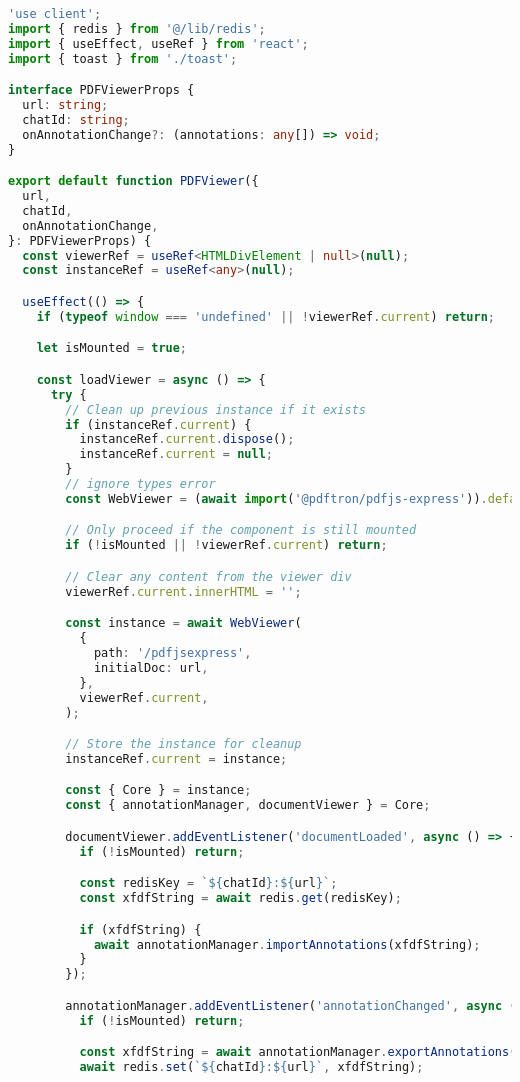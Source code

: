 \begin{lstlisting}[language=TypeScript, caption={Fitur anotasi PDF}]
'use client';
import { redis } from '@/lib/redis';
import { useEffect, useRef } from 'react';
import { toast } from './toast';

interface PDFViewerProps {
  url: string;
  chatId: string;
  onAnnotationChange?: (annotations: any[]) => void;
}

export default function PDFViewer({
  url,
  chatId,
  onAnnotationChange,
}: PDFViewerProps) {
  const viewerRef = useRef<HTMLDivElement | null>(null);
  const instanceRef = useRef<any>(null);

  useEffect(() => {
    if (typeof window === 'undefined' || !viewerRef.current) return;

    let isMounted = true;

    const loadViewer = async () => {
      try {
        // Clean up previous instance if it exists
        if (instanceRef.current) {
          instanceRef.current.dispose();
          instanceRef.current = null;
        }
        // ignore types error
        const WebViewer = (await import('@pdftron/pdfjs-express')).default;

        // Only proceed if the component is still mounted
        if (!isMounted || !viewerRef.current) return;

        // Clear any content from the viewer div
        viewerRef.current.innerHTML = '';

        const instance = await WebViewer(
          {
            path: '/pdfjsexpress',
            initialDoc: url,
          },
          viewerRef.current,
        );

        // Store the instance for cleanup
        instanceRef.current = instance;

        const { Core } = instance;
        const { annotationManager, documentViewer } = Core;

        documentViewer.addEventListener('documentLoaded', async () => {
          if (!isMounted) return;

          const redisKey = `${chatId}:${url}`;
          const xfdfString = await redis.get(redisKey);

          if (xfdfString) {
            await annotationManager.importAnnotations(xfdfString);
          }
        });

        annotationManager.addEventListener('annotationChanged', async () => {
          if (!isMounted) return;

          const xfdfString = await annotationManager.exportAnnotations();
          await redis.set(`${chatId}:${url}`, xfdfString);


\end{lstlisting}

